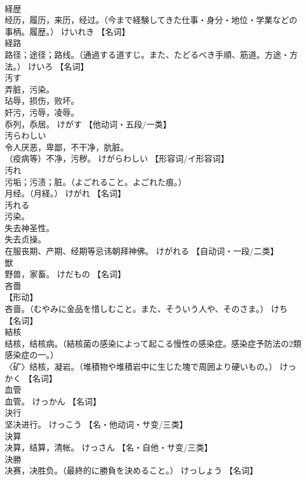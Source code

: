 \documentclass[8pt]{extreport}
\begin{document}
\begin{CJK}{UTF8}{min}
\\	経歴	
\\	经历，履历，来历，经过。（今まで経験してきた仕事・身分・地位・学業などの事柄。履歴。）	けいれき		【名词】
\\	経路	
\\	路径；途径；路线。（通過する道すじ。また、たどるべき手順、筋道。方途・方法。）	けいろ		【名词】
\\	汚す	
\\	弄脏，污染。 
\\	玷辱，损伤，败坏。 
\\	奸污，污辱，凌辱。 
\\	忝列，忝居。	けがす		【他动词・五段/一类】
\\	汚らわしい	
\\	令人厌恶，卑鄙，不干净，肮脏。 
\\	（疫病等）不净，污秽。	けがらわしい		【形容词/イ形容词】
\\	汚れ	
\\	污垢；污渍；脏。（よごれること。よごれた痕。） 
\\	月经。（月経。）	けがれ		【名词】
\\	汚れる	
\\	污染。 
\\	失去神圣性。 
\\	失去贞操。 
\\	在服丧期、产期、经期等忌讳朝拜神佛。	けがれる		【自动词・一段/二类】
\\	獣	
\\	野兽，家畜。	けだもの		【名词】
\\	吝嗇	
\\	【形动】 
\\	吝啬。（むやみに金品を惜しむこと。また、そういう人や、そのさま。）	けち		【名词】
\\	結核	
\\	结核，结核病。（結核菌の感染によって起こる慢性の感染症。感染症予防法の2類感染症の一。） 
\\	〈矿〉结核，凝岩。（堆積物や堆積岩中に生じた塊で周囲より硬いもの。）	けっかく		【名词】
\\	血管	
\\	血管。	けっかん		【名词】
\\	決行	
\\	坚决进行。	けっこう		【名・他动词・サ变/三类】
\\	決算	
\\	决算，结算，清帐。	けっさん		【名・自他・サ变/三类】
\\	決勝	
\\	决赛，决胜负。（最終的に勝負を決めること。）	けっしょう		【名词】

\end{CJK}
\end{document}
